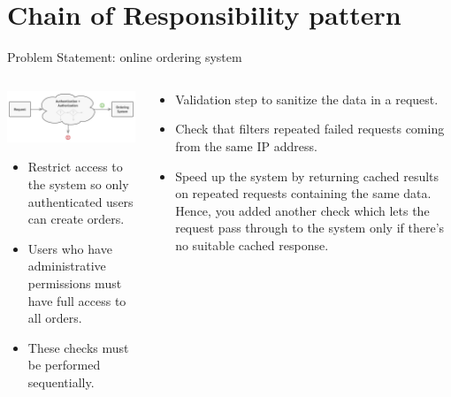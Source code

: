 \documentclass[13pt]{beamer}
\begin{document}
\section{Chain of Responsibility pattern}

\begin{frame}{Problem Statement: online ordering system}
	\begin{columns}[T]
		\begin{column}{.5\textwidth}
			\includegraphics[scale=0.3]{./images/problem.png}
			\begin{itemize}
				\item Restrict access to the system so only authenticated users can create orders.
				\item Users who have administrative permissions must have full access to all orders.
				\item These checks must be performed sequentially.
			\end{itemize}
		\end{column}
	
		\begin{column}{.5\textwidth}
			\begin{itemize}
				\item Validation step to sanitize the data in a request.
				\item Check that filters repeated failed requests coming from the same IP address.
				\item Speed up the system by returning cached results on repeated requests containing the same data. Hence, you added another check which lets the request pass through to the system only if there’s no suitable cached response.
			\end{itemize}
		\end{column}
	\end{columns}
\end{frame}
\end{document}
